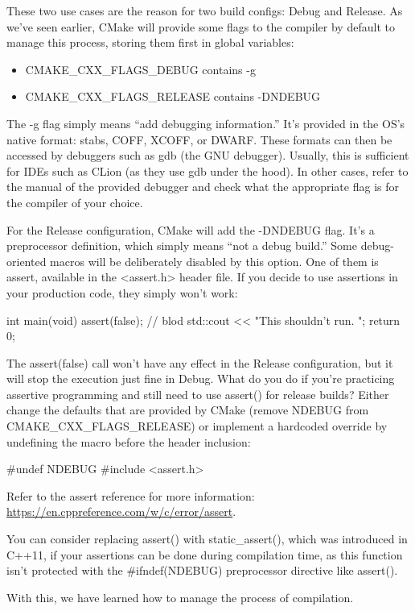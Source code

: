 These two use cases are the reason for two build configs: Debug and Release. As we’ve seen earlier, CMake will provide some flags to the compiler by default to manage this process, storing them first in global variables:

\begin{itemize}
\item
CMAKE\_CXX\_FLAGS\_DEBUG contains -g

\item
CMAKE\_CXX\_FLAGS\_RELEASE contains -DNDEBUG
\end{itemize}

The -g flag simply means “add debugging information.” It’s provided in the OS’s native format: stabs, COFF, XCOFF, or DWARF. These formats can then be accessed by debuggers such as gdb (the GNU debugger). Usually, this is sufficient for IDEs such as CLion (as they use gdb under the hood). In other cases, refer to the manual of the provided debugger and check what the appropriate flag is for the compiler of your choice.

For the Release configuration, CMake will add the -DNDEBUG flag. It’s a preprocessor definition, which simply means “not a debug build.” Some debug-oriented macros will be deliberately disabled by this option. One of them is assert, available in the <assert.h> header file. If you decide to use assertions in your production code, they simply won’t work:

\begin{cpp}
int main(void)
{
    assert(false); // blod
    std::cout << "This shouldn't run. \n";
    return 0;
}
\end{cpp}

The assert(false) call won’t have any effect in the Release configuration, but it will stop the execution just fine in Debug. What do you do if you’re practicing assertive programming and still need to use assert() for release builds? Either change the defaults that are provided by CMake (remove NDEBUG from CMAKE\_CXX\_FLAGS\_RELEASE) or implement a hardcoded override by undefining the macro before the header inclusion:

\begin{cpp}
#undef NDEBUG
#include <assert.h>
\end{cpp}

Refer to the assert reference for more information: \url{https://en.cppreference.com/w/c/error/assert}.

You can consider replacing assert() with static\_assert(), which was introduced in C++11, if your assertions can be done during compilation time, as this function isn’t protected with the \#ifndef(NDEBUG) preprocessor directive like assert().

With this, we have learned how to manage the process of compilation.











